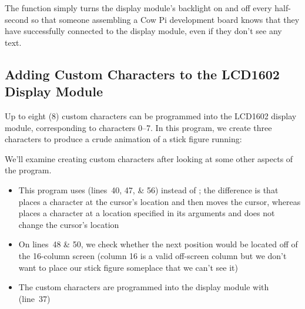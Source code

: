 {    The  function simply turns the display module's backlight on and off every half-second so that someone assembling a Cow Pi development board knows that they have successfully connected to the display module, even if they don't see any text.

\subsection{Adding Custom Characters to the LCD1602 Display Module} \label{subsec:CustomCharacters}

    Up to eight (8) custom characters can be programmed into the LCD1602 display module, corresponding to characters 0--7.
    In this program, we create three characters to produce a crude animation of a stick figure running:

    

    We'll examine creating custom characters after looking at some other aspects of the program.
    \begin{itemize}
        \item This program uses \hyperlink{function:cowpi_lcd1602_place_character}{} (lines~40, 47, \& 56) instead of ;
            the difference is that  places a character at the cursor's location and then moves the cursor, whereas  places a character at a location specified in its arguments and does not change the cursor's location
        \item On lines~48 \& 50, we check whether the next position would be located off of the 16-column screen (column 16 is a valid off-screen column but we don't want to place our stick figure someplace that we can't see it)
        \item The custom characters are programmed into the display module with \hyperlink{function:cowpi_lcd1602_create_character}{} (line~37)
    \end{itemize}

}
